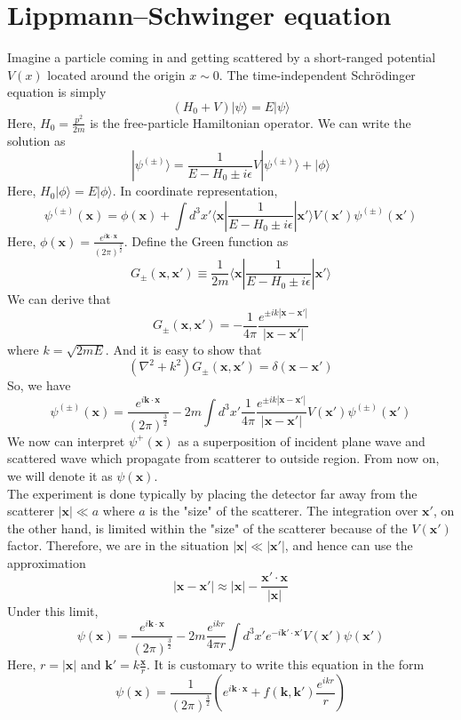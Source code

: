 \section{Lippmann–Schwinger equation}
Imagine a particle coming in and getting scattered by a short-ranged potential $V(x)$ located around the origin $x \sim 0$. The time-independent Schr\"{o}dinger equation is simply
\[(H_0 + V)|\psi\rangle = E |\psi\rangle\]
Here, $H_0 = \frac{p^2}{2m}$ is the free-particle Hamiltonian operator. We can write the solution as
\[|\psi^{(\pm)}\rangle = \frac{1}{E-H_0 \pm i\epsilon}V|\psi^{(\pm)}\rangle + |\phi\rangle\]
Here, $H_0 |\phi\rangle = E |\phi\rangle$. In coordinate representation,
\[\psi^{(\pm)}(\mathbf{x}) = \phi(\mathbf{x}) + \int d^3x' \langle \bm{x} | \frac{1}{E-H_0 \pm i\epsilon} | \bm{x}' \rangle V(\bm{x}') \psi^{(\pm)}(\bm{x}')\]
Here, $\phi(\bm{x}) = \frac{e^{i\bm{k}\cdot\bm{x}}}{(2\pi)^{\frac{3}{2}}}$. Define the Green function as
\[G_{\pm}(\bm{x},\bm{x}') \equiv \frac{1}{2m} \langle \bm{x} | \frac{1}{E-H_0 \pm i\epsilon} | \bm{x}' \rangle\]
We can derive that
\[G_{\pm}(\bm{x},\bm{x}') = -\frac{1}{4\pi} \frac{e^{\pm ik|\bm{x}-\bm{x}'|}}{|\bm{x}-\bm{x}'|}\]
where $k = \sqrt{2mE}$. And it is easy to show that
\[(\nabla^2 + k^2)G_{\pm}(\bm{x},\bm{x}') = \delta(\bm{x}-\bm{x}')\]
So, we have
\[\psi^{(\pm)}(\bm{x}) = \frac{e^{i\bm{k}\cdot\bm{x}}}{(2\pi)^{\frac{3}{2}}} - 2m \int d^3x' \frac{1}{4\pi} \frac{e^{\pm ik|\bm{x}-\bm{x}'|}}{|\bm{x}-\bm{x}'|} V(\bm{x}') \psi^{(\pm)}(\bm{x}')\]
We now can interpret $\psi^{+}(\bm{x})$ as a superposition of incident plane wave and scattered wave which propagate from scatterer to outside region. From now on, we will denote it as $\psi(\bm{x})$.
\\
The experiment is done typically by placing the detector far away from the scatterer $|\bm{x}| \ll a$ where $a$ is the "size" of the scatterer. The integration over $\bm{x}'$, on the other hand, is limited within the "size" of the scatterer because of the $V(\bm{x}')$ factor. Therefore, we are in the situation $|\bm{x}| \ll |\bm{x}'|$, and hence can use the approximation
\[|\bm{x}-\bm{x}'| \approx |\bm{x}| - \frac{\bm{x}' \cdot \bm{x}}{|\bm{x}|}\]
Under this limit,
\[\psi(\bm{x}) = \frac{e^{i\bm{k}\cdot\bm{x}}}{(2\pi)^{\frac{3}{2}}} - 2m \frac{e^{ikr}}{4\pi r} \int d^3x' e^{-i\bm{k}' \cdot \bm{x}'} V(\bm{x}') \psi(\bm{x}')\]
Here, $r = |\bm{x}|$ and $\bm{k}' = k \frac{\bm{x}}{r}$. It is customary to write this equation in the form
\[\psi(\bm{x}) = \frac{1}{(2\pi)^{\frac{3}{2}}}\left( e^{i\bm{k}\cdot\bm{x}} +  f(\bm{k},\bm{k}') \frac{e^{ikr}}{r} \right) \]
